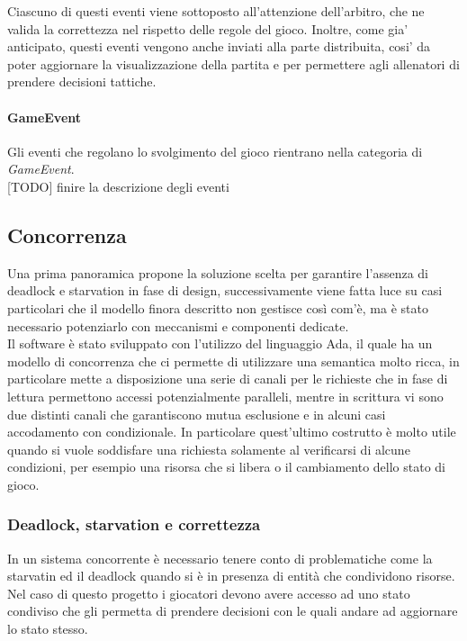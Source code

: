 Ciascuno di questi eventi viene sottoposto all'attenzione dell'arbitro, che ne valida la correttezza nel rispetto delle regole del gioco. Inoltre, come gia' anticipato, questi eventi vengono anche inviati alla parte distribuita, cosi' da poter aggiornare la visualizzazione della partita e per permettere agli allenatori di prendere decisioni tattiche.

\paragraph{GameEvent} Gli eventi che regolano lo svolgimento del gioco rientrano nella categoria di \textit{GameEvent}. \\

[TODO] finire la descrizione degli eventi

\subsection{Concorrenza}
\label{sec:analisi_concorrenza}

Una prima panoramica propone la soluzione scelta per garantire l'assenza di deadlock e starvation in fase di design, successivamente viene fatta luce su casi particolari che il modello finora descritto non gestisce così com'è, ma è stato necessario potenziarlo con meccanismi e componenti dedicate.\\

Il software è stato sviluppato con l'utilizzo del linguaggio Ada, il quale ha un modello di concorrenza che ci permette di utilizzare una semantica molto ricca, in particolare mette a disposizione una serie di canali per le richieste che in fase di lettura permettono accessi potenzialmente paralleli, mentre in scrittura vi sono due distinti canali che garantiscono mutua esclusione e in alcuni casi accodamento con condizionale. In particolare quest'ultimo costrutto è molto utile quando si vuole soddisfare una richiesta solamente al verificarsi di alcune condizioni, per esempio una risorsa che si libera o il cambiamento dello stato di gioco.

\subsubsection{Deadlock, starvation e correttezza}
\label{sec:analisi_concorrenza_deadlock}

In un sistema concorrente è necessario tenere conto di problematiche come la starvatin ed il deadlock quando si è in presenza di entità che condividono risorse. Nel caso di questo progetto i giocatori devono avere accesso ad uno stato condiviso che gli permetta di prendere decisioni con le quali andare ad aggiornare lo stato stesso.\\

